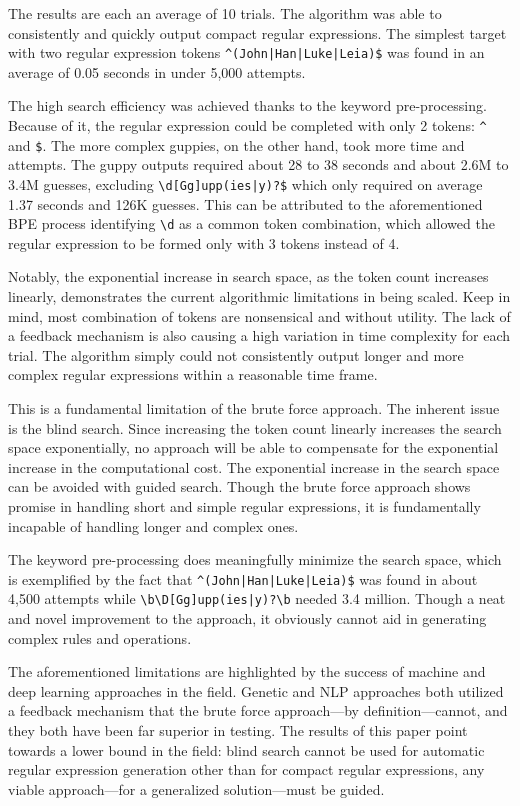 \documentclass[10pt,twocolumn]{article}
\begin{document}
The results are each an average of 10 trials. The algorithm was able to consistently and quickly output compact regular expressions. The simplest target with two regular expression tokens \texttt{\^{}(John|Han|Luke|Leia)\$} was found in an average of 0.05 seconds in under 5,000 attempts. 

The high search efficiency was achieved thanks to the keyword pre-processing. Because of it, the regular expression could be completed with only 2 tokens: \texttt{\^{}} and \texttt{\$}. The more complex guppies, on the other hand, took more time and attempts. The guppy outputs required about 28 to 38 seconds and about 2.6M to 3.4M guesses, excluding \texttt{\textbackslash d[Gg]upp(ies|y)?\$} which only required on average 1.37 seconds and 126K guesses. This can be attributed to the aforementioned BPE process identifying \texttt{\textbackslash d} as a common token combination, which allowed the regular expression to be formed only with 3 tokens instead of 4. 

Notably, the exponential increase in search space, as the token count increases linearly, demonstrates the current algorithmic limitations in being scaled. Keep in mind, most combination of tokens are nonsensical and without utility. The lack of a feedback mechanism is also causing a high variation in time complexity for each trial. The algorithm simply could not consistently output longer and more complex regular expressions within a reasonable time frame. 

This is a fundamental limitation of the brute force approach. The inherent issue is the blind search. Since increasing the token count linearly increases the search space exponentially, no approach will be able to compensate for the exponential increase in the computational cost. The exponential increase in the search space can be avoided with guided search. Though the brute force approach shows promise in handling short and simple regular expressions, it is fundamentally incapable of handling longer and complex ones. 

The keyword pre-processing does meaningfully minimize the search space, which is exemplified by the fact that \texttt{\^{}(John|Han|Luke|Leia)\$} was found in about 4,500 attempts while \texttt{\textbackslash b\textbackslash D[Gg]upp(ies|y)?\textbackslash b} needed 3.4 million. Though a neat and novel improvement to the approach, it obviously cannot aid in generating complex rules and operations. 

The aforementioned limitations are highlighted by the success of machine and deep learning approaches in the field. Genetic and NLP approaches both utilized a feedback mechanism that the brute force approach—by definition—cannot, and they both have been far superior in testing. The results of this paper point towards a lower bound in the field: blind search cannot be used for automatic regular expression generation other than for compact regular expressions, any viable approach—for a generalized solution—must be guided.
\end{document}
